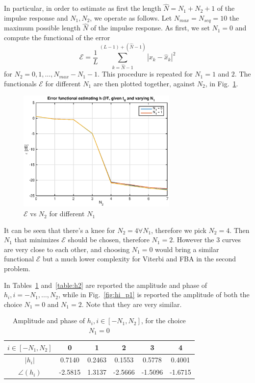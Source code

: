 \documentclass[10pt]{article}
\begin{document}
In particular, in order to estimate as first the length $\hat{N} = N_1 + N_2 + 1$ of the impulse response and $N_1, N_2$, we operate as follows. Let $N_{max} = N_{seq} = 10$ the maximum possible length $\hat{N}$ of the impulse response. As first, we set $N_1 = 0$ and compute the functional of the error 
\begin{equation} 
	\mathcal{E} = \frac{1}{L}\sum_{k = \hat{N} - 1}^{(L-1)+(\hat{N}-1)}|x_k-\hat{x}_k|^2
	\label{eq:functional}
\end{equation}
for $N_2 = 0, 1, \dots, N_{max} - N_1 - 1$. This procedure is repeated for $N_1 = 1$ and $2$. The functionals $\mathcal{E}$ for different $N_1$ are then plotted together, against $N_2$, in Fig.~\ref{fig:functional}.
\begin{figure}[h!]
	\centering
	\includegraphics[width = 0.7\textwidth]{error_func_p1}
	\caption{$\mathcal{E}$ vs $N_2$ for different $N_1$}
	\label{fig:functional}
\end{figure}
It can be seen that there's a knee for $N_2 = 4 \forall N_1$, therefore we pick $N_2 = 4$. Then $N_1$ that minimizes $\mathcal{E}$ should be chosen, therefore $N_1 = 2$. However the 3 curves are very close to each other, and choosing $N_1 = 0$ would bring a similar functional $\mathcal{E}$ but a much lower complexity for Viterbi and FBA in the second problem. 

In Tables~\ref{table:h0} and~\ref{table:h2} are reported the amplitude and phase of $h_i, i = -N_1, \dots, N_2$, while in Fig.~\ref{fig:hi_p1} is reported the amplitude of both the choice $N_1 = 0$ and $N_1 = 2$. Note that they are very similar.


\begin{table}[h!]
	\centering
	\begin{tabular}{c|c|c|c|c|c}
		$i \in [-N_1, N_2]$ & 0 & 1 & 2 & 3 & 4 \\ \hline
		$|h_i|$ 		& 0.7140  &  0.2463  &  0.1553  &  0.5778  &  0.4001 \\
		$\angle(h_i)$ 	& -2.5815  &  1.3137  & -2.5666  & -1.5096  & -1.6715 \\
	\end{tabular}
	\caption{Amplitude and phase of $h_i, i \in [-N_1, N_2]$, for the choice $N_1 = 0$}
	\label{table:h0}
\end{table}
\end{document}

